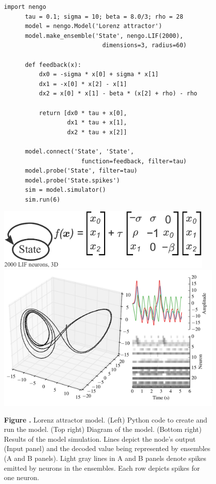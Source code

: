 \documentclass{frontiersSCNS}
\begin{document}
\begin{figure}
\begin{center}
  \begin{minipage}{0.43\textwidth}
    \begin{lstlisting}[basicstyle={\footnotesize\ttfamily}]
      import nengo
      tau = 0.1; sigma = 10; beta = 8.0/3; rho = 28
      model = nengo.Model('Lorenz attractor')
      model.make_ensemble('State', nengo.LIF(2000),
                            dimensions=3, radius=60)

      def feedback(x):
          dx0 = -sigma * x[0] + sigma * x[1]
          dx1 = -x[0] * x[2] - x[1]
          dx2 = x[0] * x[1] - beta * (x[2] + rho) - rho

          return [dx0 * tau + x[0],
                  dx1 * tau + x[1],
                  dx2 * tau + x[2]]

      model.connect('State', 'State',
                      function=feedback, filter=tau)
      model.probe('State', filter=tau)
      model.probe('State.spikes')
      sim = model.simulator()
      sim.run(6)
    \end{lstlisting}
  \end{minipage}
  \begin{minipage}{0.55\textwidth}
    \includegraphics[width=0.95\textwidth]{lorenz}
    \includegraphics[width=\textwidth]{lorenz_res}
  \end{minipage}
\end{center}
 \textbf{\label{fig:lorenz} Figure .}{
   Lorenz attractor model. (Left) Python code to create and run the model.
   (Top right) Diagram of the model.
   (Bottom right) Results of the model simulation. Lines depict
   the node's output (Input panel) and the decoded value being represented
   by ensembles (A and B panels). Light gray lines in A and B panels denote
   spikes emitted by neurons in the ensembles. Each row depicts spikes
   for one neuron.}
\end{figure}
\end{document}
